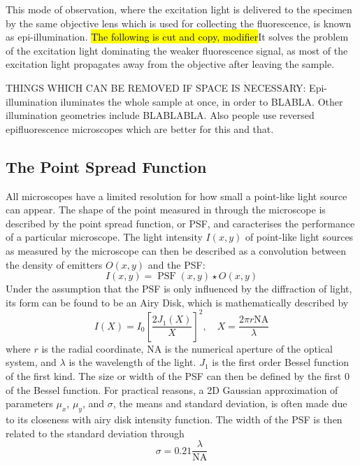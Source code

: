 This mode of observation, where the excitation light is delivered to the specimen by the same objective lens which is used for collecting the fluorescence, 
is known as epi-illumination.
\hl{The following is cut and copy, modifier}It solves the problem of the excitation light dominating the weaker fluorescence signal, as most of the excitation light propagates away from the objective after leaving  the sample.

THINGS WHICH CAN BE REMOVED IF SPACE IS NECESSARY:
Epi-illumination iluminates the whole sample at once, in order to BLABLA. 
Other illumination geometries include BLABLABLA.
Also people use reversed epifluorescence microscopes which are better for this and that.



\subsection{The Point Spread Function}

All microscopes have a limited resolution for how small a point-like light source can appear. The shape of the point measured in through the microscope is described by the point spread function, or PSF, and caracterises the performance of a particular microscope. The light intensity $I(x, y)$ of point-like light sources as measured by the microscope can then be described as a convolution between the density of emitters $O(x, y)$ and the PSF:
\begin{equation}
    I(x, y) = \operatorname{PSF}(x, y) \star O(x, y)
\end{equation}
Under the assumption that the PSF is only influenced by the diffraction of light, its form can be found to be an Airy Disk, which is mathematically described by
\begin{equation}
    I(X) = I_0 \left[ \frac{2 J_1(X)}{X} \right]^{2}, \quad X = \frac{2\pi r \textrm{NA}}{\lambda}
\end{equation}
where $r$ is the radial coordinate, NA is the numerical aperture of the optical system, and $\lambda$ is the wavelength of the light. $J_1$ is the first order Bessel function of the first kind. The size or width of the PSF can then be defined by the first $0$ of the Bessel function.
For practical reasons, a 2D Gaussian approximation of parameters $\mu_x$, $\mu_y$, and $\sigma$, the means and standard deviation, is often made due to its closeness with airy disk intensity function. The width of the PSF is then related to the standard deviation through
\begin{equation}
    \sigma = 0.21 \frac{\lambda}{\textrm{NA}}
    \label{eq:PSF_width_gaussian}
\end{equation}


